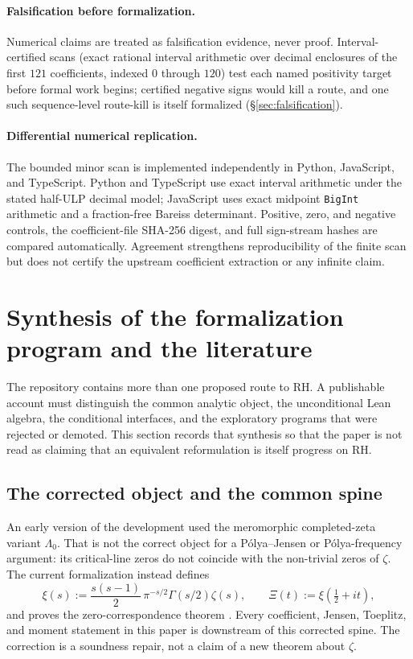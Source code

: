 \documentclass[11pt,a4paper]{article}
\theoremstyle{definition}
\newcommand{\Lean}[1]{\texttt{\small\seqsplit{#1}}}
\begin{document}
\paragraph{Falsification before formalization.}  Numerical claims are
treated as falsification evidence, never proof.  Interval-certified scans
(exact rational interval arithmetic over decimal enclosures of the first
$121$ coefficients, indexed $0$ through $120$) test each named positivity target before formal work
begins; certified negative signs would kill a route, and one such
sequence-level route-kill is itself formalized
(\S\ref{sec:falsification}).

\paragraph{Differential numerical replication.}  The bounded minor scan is
implemented independently in Python, JavaScript, and TypeScript.  Python and
TypeScript use exact interval arithmetic under the stated half-ULP
decimal model; JavaScript uses exact midpoint \texttt{BigInt} arithmetic and a
fraction-free Bareiss determinant.  Positive, zero, and negative controls,
the coefficient-file SHA-256 digest, and full sign-stream hashes are compared
automatically.  Agreement strengthens reproducibility of the finite scan but
does not certify the upstream coefficient extraction or any infinite claim.

\section{Synthesis of the formalization program and the literature}
\label{sec:synthesis}

The repository contains more than one proposed route to RH.  A publishable
account must distinguish the common analytic object, the unconditional Lean
algebra, the conditional interfaces, and the exploratory programs that were
rejected or demoted.  This section records that synthesis so that the paper is
not read as claiming that an equivalent reformulation is itself progress on
RH.

\subsection{The corrected object and the common spine}

An early version of the development used the meromorphic completed-zeta
variant $\Lambda_0$.  That is not the correct object for a P\'olya--Jensen or
P\'olya-frequency argument: its critical-line zeros do not coincide with the
non-trivial zeros of $\zeta$.  The current formalization instead defines
\begin{equation}
  \xi(s):=\frac{s(s-1)}{2}\,\pi^{-s/2}\Gamma(s/2)\zeta(s),
  \qquad \Xi(t):=\xi\!\left(\tfrac12+it\right),
  \label{eq:xi-common-spine}
\end{equation}
and proves the zero-correspondence theorem
\Lean{Xi\_eq\_zero\_iff\_riemannZeta}.  Every coefficient, Jensen, Toeplitz,
and moment statement in this paper is downstream of this corrected spine.
The correction is a soundness repair, not a claim of a new theorem about
$\zeta$.
\end{document}
